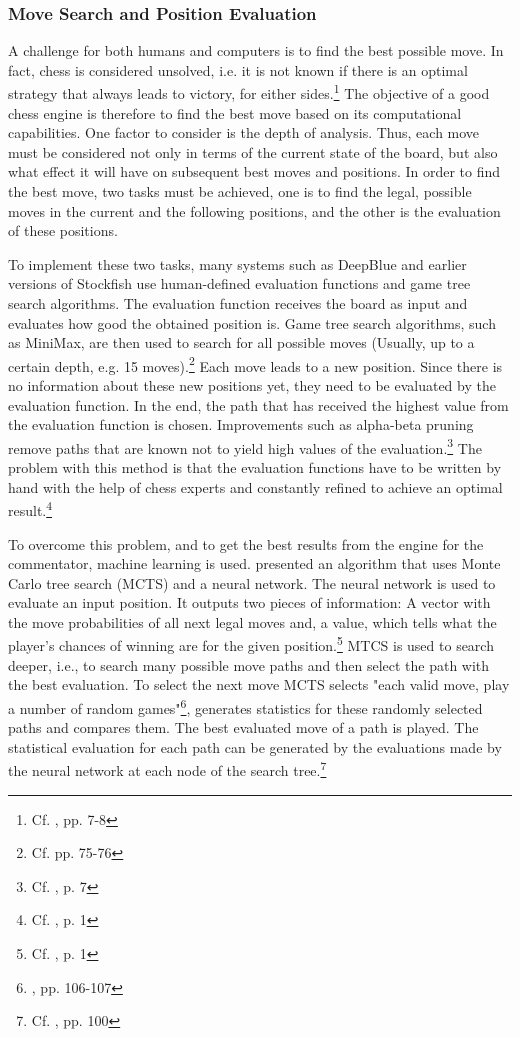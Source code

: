 \subsubsection{Move Search and Position Evaluation}

A challenge for both humans and computers is to find the best possible move. In fact, chess is considered unsolved, i.e. it is not known if there is an optimal strategy that always leads to victory, for either sides.\footnote{Cf. \cite{allis-1994-solving}, pp. 7-8} The objective of a good chess engine is therefore to find the best move based on its computational capabilities. One factor to consider is the depth of analysis. Thus, each move must be considered not only in terms of the current state of the board, but also what effect it will have on subsequent best moves and positions. In order to find the best move, two tasks must be achieved, one is to find the legal, possible moves in the current and the following positions, and the other is the evaluation of these positions.

To implement these two tasks, many systems such as \Gls{DeepBlue} and earlier versions of \Gls{Stockfish} use human-defined evaluation functions and game tree search algorithms. The evaluation function receives the board as input and evaluates how good the obtained position is. Game tree search algorithms, such as MiniMax, are then used to search for all possible moves (Usually, up to a certain depth, e.g. 15 moves).\footnote{Cf. \cite{nnfc-2022} pp. 75-76} Each move leads to a new position. Since there is no information about these new positions yet, they need to be evaluated by the evaluation function. In the end, the path that has received the highest value from the evaluation function is chosen. Improvements such as alpha-beta pruning remove paths that are known not to yield high values of the evaluation.\footnote{Cf. \cite{keen-2009-history}, p. 7} The problem with this method is that the evaluation functions have to be written by hand with the help of chess experts and constantly refined to achieve an optimal result.\footnote{Cf. \cite{alphazero-2018}, p. 1}

To overcome this problem, and to get the best results from the engine for the commentator, machine learning is used. \cite{alphazero-2018} presented an algorithm that uses Monte Carlo tree search (MCTS) and a neural network. The neural network is used to evaluate an input position. It outputs two pieces of information: A vector with the move probabilities of all next legal moves and, a value, which tells what the player's chances of winning are for the given position.\footnote{Cf. \cite{alphazero-2018}, p. 1} MTCS is used to search deeper, i.e., to search many possible move paths and then select the path with the best evaluation. To select the next move MCTS selects "each valid move, play a number of random games"\footnote{\cite{nnfc-2022}, pp. 106-107}, generates statistics for these randomly selected paths and compares them. The best evaluated move of a path is played. The statistical evaluation for each path can be generated by the evaluations made by the neural network at each node of the search tree.\footnote{Cf. \cite{nnfc-2022}, pp. 100}

